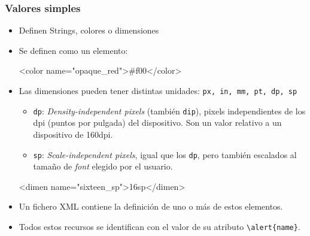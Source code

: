 \documentclass[hyperref={pdfpagelabels=true},ucs]{beamer}
\begin{document}
\begin{frame}[fragile,shrink=10]
\frametitle{Valores simples}

\begin{itemize}

\item Definen Strings, colores o dimensiones
\item Se definen como un elemento:
\begin{tiny}
\begin{block}{}
\begin{xml}
<color name="opaque_red">#f00</color>
\end{xml}
\end{block}
\end{tiny}

\item Las dimensiones pueden tener distintas unidades:
  \verb|px, in, mm, pt, dp, sp|
  \begin{itemize}
  \item \verb|dp|: \emph{Density-independent pixels} (también
    \verb|dip|), pixels independientes de los dpi (puntos por pulgada)
    del dispositivo. Son un valor relativo a un dispositivo de
    160dpi.
  \item \verb|sp|: \emph{Scale-independent pixels}, igual que los
    \verb|dp|, pero también escalados al tamaño de \emph{font} elegido
    por el usuario.
\end{itemize}
\begin{tiny}
\begin{block}{}
\begin{xml}
<dimen name="sixteen_sp">16sp</dimen>
\end{xml}
\end{block}
\end{tiny}

\item Un fichero XML contiene la definición de uno o más de estos elementos.
\item \alert{Todos estos recursos se identifican con el valor de su
    atributo} \Verb|\alert{name}|.
\end{itemize}

\end{frame}
\end{document}
